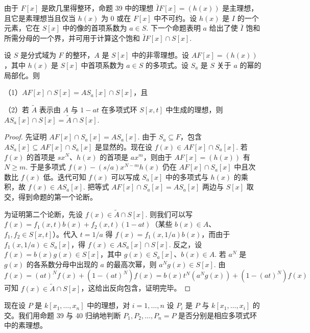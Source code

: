 由于 \(F[x]\) 是欧几里得整环，命题 39 中的理想 \(\bar IF[x] = (h(x))\) 是主理想，且它是素理想当且仅当 \(h(x)\) 为 0 或在 \(F[x]\) 中不可约。设 \(h(x)\) 是 \(I\) 的一个元素，它在 \(S[x]\) 中的像的首项系数为 \(a \in S\). 下一个命题表明 \(a\) 给出了使 \(\bar I\) 饱和所需分母的一个界，并可用于计算这个饱和 \(\bar IF[x] \cap S[x]\).

\begin{proposition}\label{pro:15.40}
设 \(S\) 是分式域为 \(F\) 的整环，\(A\) 是 \(S[x]\) 中的非零理想。设 \(AF[x] = (h(x))\)，其中 \(h(x)\) 是 \(S[x]\) 中首项系数为 \(a \in S\) 的多项式。设 \(S_a\) 是 \(S\) 关于 \(a\) 的幂的局部化。则

（1）\(AF[x] \cap S[x] = AS_a[x] \cap S[x]\)，且

（2）若 \(\tilde A\) 表示由 \(A\) 与 \(1-at\) 在多项式环 \(S[x,t]\) 中生成的理想，则 \(AS_a[x] \cap S[x] = \tilde A \cap S[x]\).
\end{proposition}

\begin{proof}
先证明 \(AF[x] \cap S_a[x] = AS_a[x]\). 由于 \(S_a \subseteq F\)，包含 \(AS_a[x] \subseteq AF[x] \cap S_a[x]\) 是显然的。现在设 \(f(x) \in AF[x] \cap S_a[x]\). 若 \(f(x)\) 的首项是 \(sx^N\)、\(h(x)\) 的首项是 \(ax^m\)，则由于 \(AF[x] = (h(x))\) 有 \(N \geq m\). 于是多项式 \(f(x)-(s/a)x^{N-m}h(x)\) 仍在 \(AF[x] \cap S_a[x]\) 中且次数比 \(f(x)\) 低。迭代可知 \(f(x)\) 可以写成 \(S_a[x]\) 中的多项式与 \(h(x)\) 的乘积，故 \(f(x) \in AS_a[x]\). 把等式 \(AF[x] \cap S_a[x] = AS_a[x]\) 两边与 \(S[x]\) 取交，得到命题的第一个论断。

为证明第二个论断，先设 \(f(x) \in \tilde A \cap S[x]\). 则我们可以写 \(f(x) = f_1(x,t)b(x)+f_2(x,t)(1-at)\)（某些 \(b(x) \in A\)、\(f_1, f_2 \in S[x,t]\)）。代入 \(t = 1/a\) 得 \(f(x) = f_1(x,1/a)b(x)\)，而由于 \(f_1(x,1/a) \in S_a[x]\)，得 \(f(x) \in AS_a[x] \cap S[x]\). 反之，设 \(f(x) = b(x)g(x) \in S[x]\)，其中 \(g(x) \in S_a[x]\)、\(b(x) \in A\). 若 \(a^N\) 是 \(g(x)\) 的各系数分母中出现的 \(a\) 的最高次幂，则 \(a^Ng(x) \in S[x]\). 由
\[
f(x) = (at)^Nf(x)+(1-(at)^N)f(x) = b(x)t^N(a^Ng(x))+(1-(at)^N)f(x)
\]
可知 \(f(x) \in \tilde A \cap S[x]\)，这给出反向包含，证明完毕。
\end{proof}

现在设 \(P\) 是 \(k[x_1, \ldots, x_n]\) 中的理想，对 \(i = 1, \ldots, n\) 设 \(P_i\) 是 \(P\) 与 \(k[x_1, \ldots, x_i]\) 的交。我们用命题 39 与 40 归纳地判断 \(P_1, P_2, \ldots, P_n = P\) 是否分别是相应多项式环中的素理想。

